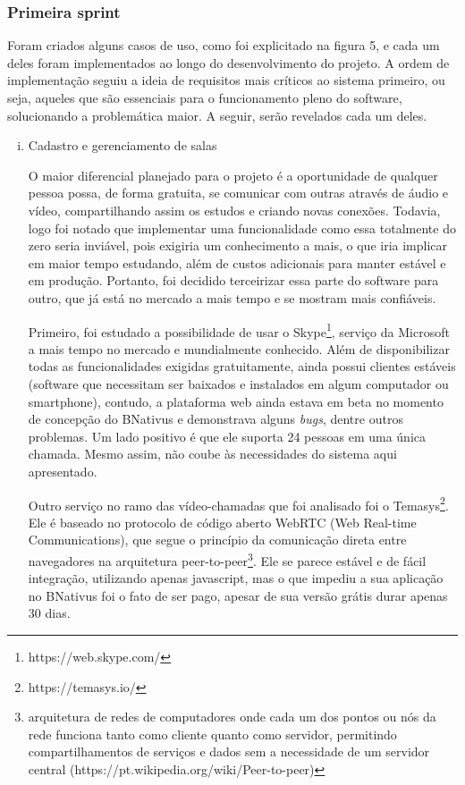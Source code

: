 \subsubsection{Primeira sprint}

Foram criados alguns casos de uso, como foi explicitado na figura 5, e cada um deles foram implementados ao longo do desenvolvimento do projeto. A ordem de implementação seguiu a ideia de requisitos mais críticos ao sistema primeiro, ou seja, aqueles que são essenciais para o funcionamento pleno do software, solucionando a problemática maior. A seguir, serão revelados cada um deles.

 \begin{enumerate}[(i)]
   \item Cadastro e gerenciamento de salas
   
    O maior diferencial planejado	 para o projeto é a oportunidade de qualquer pessoa possa, de forma gratuita, se comunicar com outras através de áudio e vídeo, compartilhando assim os estudos e criando novas conexões. Todavia, logo foi notado que implementar uma funcionalidade como essa totalmente do zero seria inviável, pois exigiria um conhecimento a mais, o que iria implicar em maior tempo estudando, além de custos adicionais para manter estável e em produção. Portanto, foi decidido terceirizar essa parte do software para outro, que já está no mercado a mais tempo e se mostram mais confiáveis.

    Primeiro, foi estudado a possibilidade de usar o Skype\footnote{https://web.skype.com/}, serviço da Microsoft a mais tempo no mercado e mundialmente conhecido. Além de disponibilizar todas as funcionalidades exigidas gratuitamente, ainda possui clientes estáveis (software que necessitam ser baixados e instalados em algum computador ou smartphone), contudo, a plataforma web ainda estava em beta no momento de concepção do BNativus e demonstrava alguns \textit{bugs}, dentre outros problemas. Um lado positivo é que ele suporta 24 pessoas em uma única chamada. Mesmo assim, não coube às necessidades do sistema aqui apresentado. 
    
    Outro serviço no ramo das vídeo-chamadas que foi analisado foi o Temasys\footnote{https://temasys.io/}. Ele é baseado no protocolo de código aberto WebRTC (Web Real-time Communications), que segue o princípio da comunicação direta entre navegadores na arquitetura peer-to-peer\footnote{arquitetura de redes de computadores onde cada um dos pontos ou nós da rede funciona tanto como cliente quanto como servidor, permitindo compartilhamentos de serviços e dados sem a necessidade de um servidor central (https://pt.wikipedia.org/wiki/Peer-to-peer)}. Ele se parece estável e de fácil integração, utilizando apenas javascript, mas o que impediu a sua aplicação no BNativus foi o fato de ser pago, apesar de sua versão grátis durar apenas 30 dias.
    

\end{enumerate}
